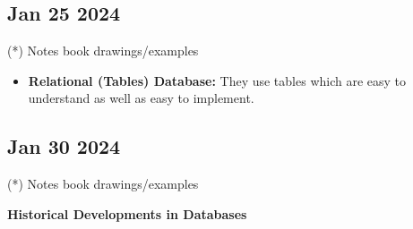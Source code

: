 \documentclass[12pt]{article}
\begin{document}
\subsection*{Jan 25 2024}

(*) Notes book drawings/examples

\begin{itemize}
		  \item \textbf{Relational (Tables)  Database:} They use tables which are easy to understand as well as
					 easy to implement. 
\end{itemize}

\subsection*{Jan 30 2024}

(*) Notes book drawings/examples

\textbf{Historical Developments in Databases}
\end{document}
